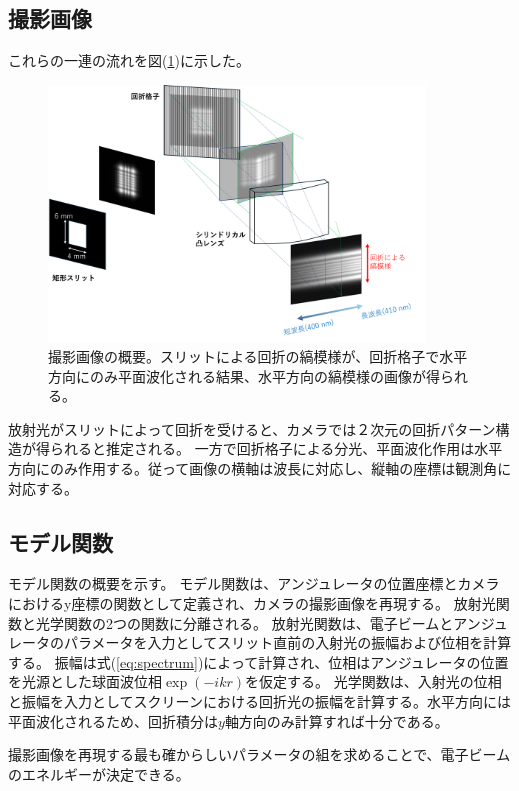 \documentclass[a4paper,11pt,uplatex]{jsbook}
\begin{document}
\subsection{撮影画像}
これらの一連の流れを図(\ref{propagation})に示した。
\begin{figure}[h]
  \centering
  \includegraphics[width=10cm]{image/2-propagation.png}
  \caption[撮影画像の概要]{撮影画像の概要。スリットによる回折の縞模様が、回折格子で水平方向にのみ平面波化される結果、水平方向の縞模様の画像が得られる。}
  \label{propagation}
\end{figure}
放射光がスリットによって回折を受けると、カメラでは２次元の回折パターン構造が得られると推定される。
一方で回折格子による分光、平面波化作用は水平方向にのみ作用する。従って画像の横軸は波長に対応し、縦軸の座標は観測角に対応する。
\subsection{モデル関数}
モデル関数の概要を示す。
モデル関数は、アンジュレータの位置座標とカメラにおけるy座標の関数として定義され、カメラの撮影画像を再現する。
放射光関数と光学関数の2つの関数に分離される。
放射光関数は、電子ビームとアンジュレータのパラメータを入力としてスリット直前の入射光の振幅および位相を計算する。
振幅は式(\ref{eq:spectrum})によって計算され、位相はアンジュレータの位置を光源とした球面波位相$\exp(-ikr)$を仮定する。
光学関数は、入射光の位相と振幅を入力としてスクリーンにおける回折光の振幅を計算する。水平方向には平面波化されるため、回折積分は$y$軸方向のみ計算すれば十分である。

撮影画像を再現する最も確からしいパラメータの組を求めることで、電子ビームのエネルギーが決定できる。
\end{document}
